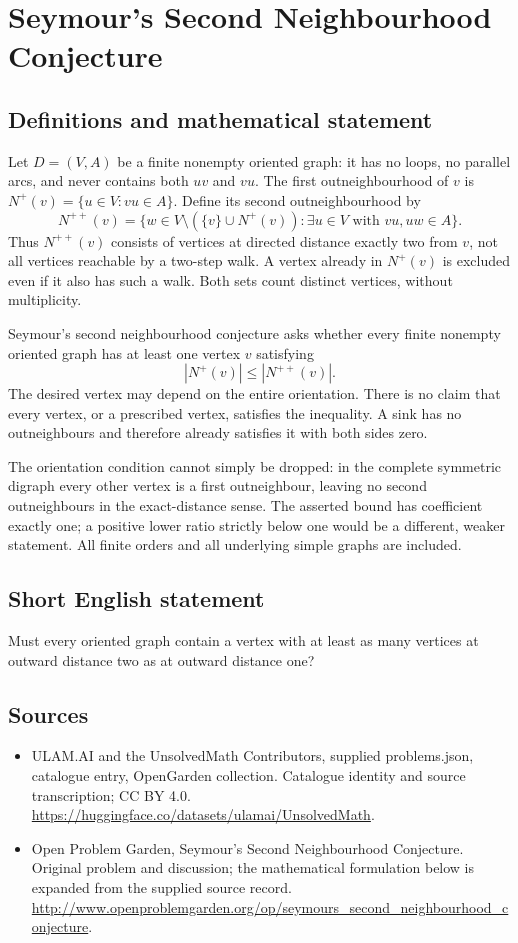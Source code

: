 \documentclass[11pt,a4paper]{article}
\begin{document}
\section*{Seymour's Second Neighbourhood Conjecture}\label{statement}

\subsection{Definitions and mathematical statement}
Let $D=(V,A)$ be a finite nonempty oriented graph: it has no loops, no
parallel arcs, and never contains both $uv$ and $vu$. The first
outneighbourhood of $v$ is
$N^+(v)=\{u\in V:vu\in A\}$. Define its second outneighbourhood by
\[
 N^{++}(v)=\{w\in V\setminus(\{v\}\cup N^+(v)):
                  \exists u\in V\text{ with }vu,uw\in A\}.
\]
Thus $N^{++}(v)$ consists of vertices at directed distance exactly two
from $v$, not all vertices reachable by a two-step walk. A vertex already
in $N^+(v)$ is excluded even if it also has such a walk. Both sets count
distinct vertices, without multiplicity.

Seymour's second neighbourhood conjecture asks whether every finite
nonempty oriented graph has at least one vertex $v$ satisfying
\[
                       |N^+(v)|\le |N^{++}(v)|.
\]
The desired vertex may depend on the entire orientation. There is no
claim that every vertex, or a prescribed vertex, satisfies the inequality.
A sink has no outneighbours and therefore already satisfies it with
both sides zero.

The orientation condition cannot simply be dropped: in the complete
symmetric digraph every other vertex is a first outneighbour, leaving
no second outneighbours in the exact-distance sense. The asserted bound
has coefficient exactly one; a positive lower ratio strictly below one
would be a different, weaker statement. All finite orders and all
underlying simple graphs are included.
\subsection{Short English statement}
Must every oriented graph contain a vertex with at least as many vertices at outward distance two as at outward distance one?
\subsection{Sources}
\begin{itemize}
\item[S1] ULAM.AI and the UnsolvedMath Contributors, supplied problems.json, catalogue entry, OpenGarden collection. Catalogue identity and source transcription; CC BY 4.0.
\url{https://huggingface.co/datasets/ulamai/UnsolvedMath}.
\item[S2] Open Problem Garden, Seymour's Second Neighbourhood Conjecture. Original problem and discussion; the mathematical formulation below is expanded from the supplied source record.
\url{http://www.openproblemgarden.org/op/seymours_second_neighbourhood_conjecture}.
\end{itemize}
\end{document}
